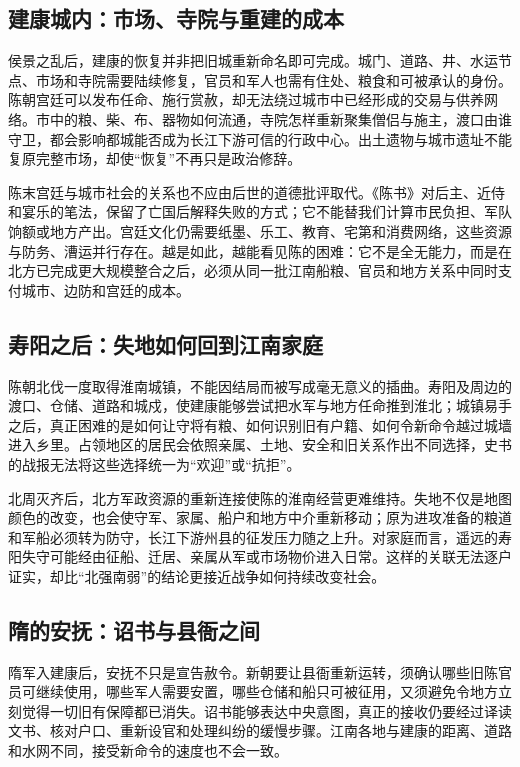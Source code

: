 \subsection{建康城内：市场、寺院与重建的成本}

侯景之乱后，建康的恢复并非把旧城重新命名即可完成。城门、道路、井、水运节点、市场和寺院需要陆续修复，官员和军人也需有住处、粮食和可被承认的身份。陈朝宫廷可以发布任命、施行赏赦，却无法绕过城市中已经形成的交易与供养网络。市中的粮、柴、布、器物如何流通，寺院怎样重新聚集僧侣与施主，渡口由谁守卫，都会影响都城能否成为长江下游可信的行政中心。出土遗物与城市遗址不能复原完整市场，却使“恢复”不再只是政治修辞。

陈末宫廷与城市社会的关系也不应由后世的道德批评取代。《陈书》对后主、近侍和宴乐的笔法，保留了亡国后解释失败的方式；它不能替我们计算市民负担、军队饷额或地方产出。宫廷文化仍需要纸墨、乐工、教育、宅第和消费网络，这些资源与防务、漕运并行存在。越是如此，越能看见陈的困难：它不是全无能力，而是在北方已完成更大规模整合之后，必须从同一批江南船粮、官员和地方关系中同时支付城市、边防和宫廷的成本。

\subsection{寿阳之后：失地如何回到江南家庭}

陈朝北伐一度取得淮南城镇，不能因结局而被写成毫无意义的插曲。寿阳及周边的渡口、仓储、道路和城戍，使建康能够尝试把水军与地方任命推到淮北；城镇易手之后，真正困难的是如何让守将有粮、如何识别旧有户籍、如何令新命令越过城墙进入乡里。占领地区的居民会依照亲属、土地、安全和旧关系作出不同选择，史书的战报无法将这些选择统一为“欢迎”或“抗拒”。

北周灭齐后，北方军政资源的重新连接使陈的淮南经营更难维持。失地不仅是地图颜色的改变，也会使守军、家属、船户和地方中介重新移动；原为进攻准备的粮道和军船必须转为防守，长江下游州县的征发压力随之上升。对家庭而言，遥远的寿阳失守可能经由征船、迁居、亲属从军或市场物价进入日常。这样的关联无法逐户证实，却比“北强南弱”的结论更接近战争如何持续改变社会。

\subsection{隋的安抚：诏书与县衙之间}

隋军入建康后，安抚不只是宣告赦令。新朝要让县衙重新运转，须确认哪些旧陈官员可继续使用，哪些军人需要安置，哪些仓储和船只可被征用，又须避免令地方立刻觉得一切旧有保障都已消失。诏书能够表达中央意图，真正的接收仍要经过译读文书、核对户口、重新设官和处理纠纷的缓慢步骤。江南各地与建康的距离、道路和水网不同，接受新命令的速度也不会一致。

